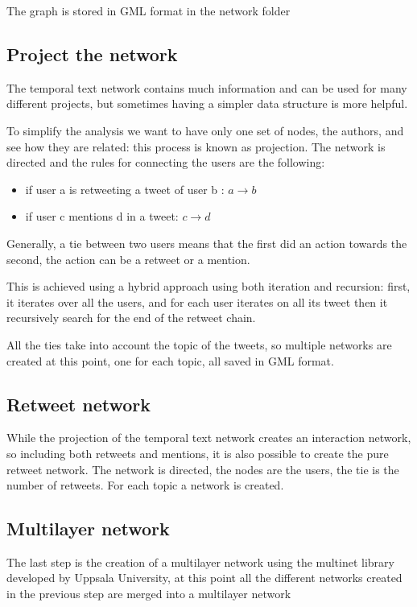 The graph is stored in GML format in the network folder

\subsection{Project the network}
The temporal text network contains much information and can be used for many different projects, but sometimes having a simpler data structure is more helpful.

To simplify the analysis we want to have only one set of nodes, the authors, and see how they are related: this process is known as projection. The network is directed and the rules for connecting the users are the following:
\begin{itemize}
    \item if user a is retweeting a tweet of user b : $a \rightarrow  b $
    \item if user c mentions d in a tweet: $ c \rightarrow d $
\end{itemize}


Generally, a tie between two users means that the first did an action towards the second, the action can be a retweet or a mention.

This is achieved using a hybrid approach using both iteration and recursion: first, it iterates over all the users, and for each user iterates on all its tweet then it recursively search for the end of the retweet chain.

All the ties take into account the topic of the tweets, so multiple networks are created at this point, one for each topic, all saved in GML format.


\subsection{Retweet network}
While the projection of the temporal text network creates an interaction network, so including both retweets and mentions, it is also possible to create the pure retweet network. 
The network is directed, the nodes are the users, the tie is the number of retweets. For each topic a network is created.

\subsection{Multilayer network}

The last step is the creation of a multilayer network using the multinet library developed by Uppsala University, at this point all the different networks created in the previous step are merged into a multilayer network

